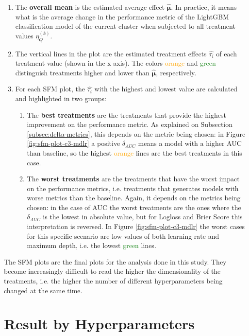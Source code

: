 \begin{enumerate}
    \item The \textbf{overall mean} is the estimated average effect $\hat{\bm{\mu}}$. In practice, it means what is the average change in the performance metric of the LightGBM classification model of the current cluster when subjected to all treatment values  $\eta^{(k)}_Q$.
    \item The vertical lines in the plot are the estimated treatment effects $\hat{\tau_i}$ of each treatment value (shown in the x axis). The colors \textcolor{orange}{orange} and \textcolor{ForestGreen}{green} distinguish treatments higher and lower than  $\hat{\bm{\mu}}$, respectively.
    \item For each SFM plot, the $\hat{\tau_i}$ with the highest and lowest value are calculated and highlighted in two groups:
    \begin{enumerate}
        \item The \textbf{best treatments} are the treatments that provide the highest improvement on the performance metric. As explained on Subsection \ref{subsec:delta-metrics}, this depends on the metric being chosen: in Figure \ref{fig:sfm-plot-c3-mdlr} a positive $\delta_{AUC}$ means a model with a higher AUC than baseline, so the highest \textcolor{orange}{orange} lines are the best treatments in this case.
        \item The \textbf{worst treatments} are the treatments that have the worst impact on the performance metrics, i.e. treatments that generates models with worse metrics than the baseline. Again, it depends on the metrics being chosen: in the case of AUC the worst treatments are the ones where the $\delta_{AUC}$ is the lowest in absolute value, but for Logloss and Brier Score this interpretation is reversed. In Figure \ref{fig:sfm-plot-c3-mdlr} the worst cases for this specific scenario are low values of both learning rate and maximum depth, i.e. the lowest \textcolor{ForestGreen}{green} lines.
    \end{enumerate}
\end{enumerate}

The SFM plots are the final plots for the analysis done in this study. They become increasingly difficult to read the higher the dimensionality of the treatments, i.e. the higher the number of different hyperparameters being changed at the same time.

\section{Result by Hyperparameters}

